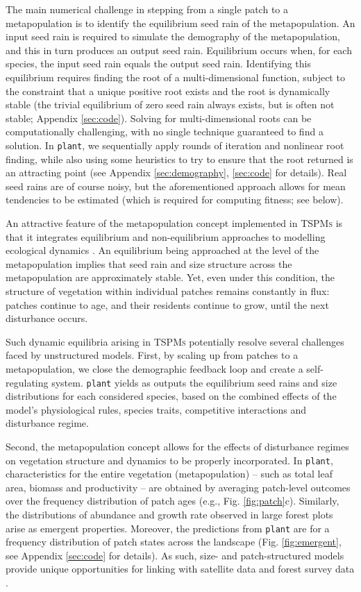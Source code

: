 \documentclass[a4paper,11pt]{article}
\newcommand{\plant}{\texttt{plant}}
\begin{document}
The main numerical challenge in stepping from a single patch to a
metapopulation is to identify the equilibrium seed rain of the
metapopulation. An input seed rain is required to simulate the
demography of the metapopulation, and this in turn produces an output
seed rain. Equilibrium occurs when, for each species,
the input seed rain equals the output seed rain. Identifying this equilibrium
requires finding the root of a multi-dimensional function, subject to
the constraint that a unique positive root exists and the root is dynamically stable (the trivial equilibrium
of zero seed rain always exists, but is often not stable; Appendix
\ref{sec:code}). Solving for multi-dimensional roots can be computationally challenging,
with no single technique guaranteed to find a solution. In {\plant}, we sequentially
apply rounds of iteration and nonlinear root finding, while also
using some heuristics to try to ensure that the root returned is an attracting point
(see Appendix \ref{sec:demography}, \ref{sec:code} for details). Real seed rains are of course noisy,
but the aforementioned approach allows for mean tendencies to be estimated (which is required for computing fitness; see below).

An attractive feature of the metapopulation concept implemented in \textsc{TSPMs}
is that it integrates equilibrium and non-equilibrium approaches to
modelling ecological dynamics \citep{Kohyama-1993, Moorcroft-2001,
 Falster-2011}. An equilibrium being approached at the level of
the metapopulation implies that seed rain and size structure across the
metapopulation are approximately stable. Yet, even under this condition, the structure of
vegetation within individual patches remains constantly in flux: patches
continue to age, and their residents continue to grow, until the next disturbance occurs.

Such dynamic equilibria arising in \textsc{TSPMs} potentially resolve several
challenges faced by unstructured models. First, by scaling up from
patches to a metapopulation, we close the demographic feedback loop and
create a self-regulating system. {\plant} yields as outputs the equilibrium seed rains and size distributions for each considered species, based on the combined effects of the model's physiological rules, species traits, competitive interactions
and disturbance regime.

Second, the metapopulation concept allows for the effects of disturbance
regimes on vegetation structure and dynamics to be properly incorporated. In
{\plant}, characteristics for the entire vegetation (metapopulation) -- such
as total leaf area, biomass and productivity -- are obtained by averaging
patch-level outcomes over the frequency distribution of patch ages (e.g.,
Fig. \ref{fig:patch}c). Similarly, the distributions of abundance and growth rate
observed in large forest plots \citep[e.g.,][]{Muller-2006, Coomes-2007} arise
as emergent properties. Moreover, the predictions from {\plant}
are for a frequency distribution of patch states across the landscape
(Fig. \ref{fig:emergent}, see Appendix \ref{sec:code} for details). As such,
size- and patch-structured models provide unique opportunities for linking with
satellite data and forest survey data \citep{Moorcroft-2001, Purves-2008}.
\end{document}

